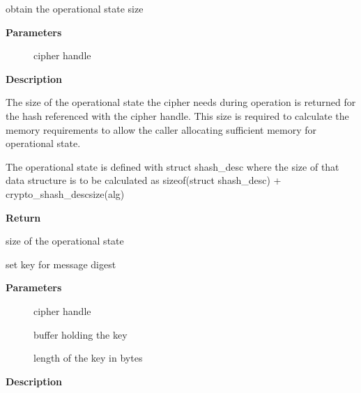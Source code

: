\documentclass[a4paper,8pt,english]{sphinxmanual}
\begin{document}
\begin{fulllineitems}
\label{crypto/api-digest:c.crypto_shash_descsize}
obtain the operational state size

\end{fulllineitems}


\textbf{Parameters}
\begin{description}
\item[{}] \leavevmode
cipher handle

\end{description}

\textbf{Description}

The size of the operational state the cipher needs during operation is
returned for the hash referenced with the cipher handle. This size is
required to calculate the memory requirements to allow the caller allocating
sufficient memory for operational state.

The operational state is defined with struct shash\_desc where the size of
that data structure is to be calculated as
sizeof(struct shash\_desc) + crypto\_shash\_descsize(alg)

\textbf{Return}

size of the operational state

\begin{fulllineitems}
\label{crypto/api-digest:c.crypto_shash_setkey}
set key for message digest

\end{fulllineitems}


\textbf{Parameters}
\begin{description}
\item[{}] \leavevmode
cipher handle

\item[{}] \leavevmode
buffer holding the key

\item[{}] \leavevmode
length of the key in bytes

\end{description}

\textbf{Description}
\end{document}
